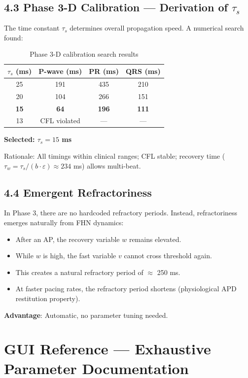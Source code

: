\documentclass[12pt,oneside,a4paper]{book}
\begin{document}
\section{4.3 Phase 3-D Calibration — Derivation of $\tau_s$}

The time constant $\tau_s$ determines overall propagation speed. A numerical search found:

\begin{table}[H]
\centering
\begin{tabularx}{\textwidth}{|c|c|c|c|}
\hline
$\tau_s$ (ms) & P-wave (ms) & PR (ms) & QRS (ms) \\
\hline
25 & 191 & 435 & 210 \\
20 & 104 & 266 & 151 \\
\textbf{15} & \textbf{64} & \textbf{196} & \textbf{111} \\
13 & CFL violated & — & — \\
\hline
\end{tabularx}
\caption{Phase 3-D calibration search results}
\label{tab:calibration}
\end{table}

\textbf{Selected: $\tau_s = 15$ ms}

Rationale: All timings within clinical ranges; CFL stable; recovery time ($\tau_w = \tau_s / (b \cdot \varepsilon) \approx 234$ ms) allows multi-beat.

\section{4.4 Emergent Refractoriness}

In Phase 3, there are no hardcoded refractory periods. Instead, refractoriness emerges naturally from FHN dynamics:

\begin{itemize}
  \item After an AP, the recovery variable $w$ remains elevated.
  \item While $w$ is high, the fast variable $v$ cannot cross threshold again.
  \item This creates a natural refractory period of \(\approx\) 250 ms.
  \item At faster pacing rates, the refractory period shortens (physiological APD restitution property).
\end{itemize}

\textbf{Advantage}: Automatic, no parameter tuning needed.

\chapter{GUI Reference — Exhaustive Parameter Documentation}
\end{document}
